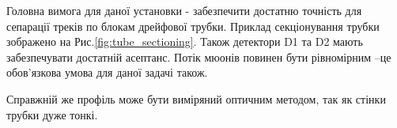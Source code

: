 	Головна вимога для даної установки - забезпечити достатню точність для сепарації треків по блокам дрейфової трубки. Приклад секціонування трубки зображено на Рис.\ref{fig:tube_sectioning}. Також детектори D1 та D2 мають забезпечувати достатній асептанс. Потік мюонів повинен бути рівномірним --це обов’язкова умова для даної задачі також.

	Справжній же профіль може бути виміряний оптичним методом, так як стінки трубки дуже тонкі.
	
	